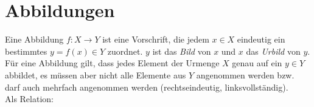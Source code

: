 \section{Abbildungen}
Eine Abbildung $f:X\to Y$ ist eine Vorschrift, die jedem $x\in X$ eindeutig ein bestimmtes
$y=f(x)\in Y$ zuordnet. $y$ ist das \emph{Bild} von $x$ und $x$ das \emph{Urbild} von $y$.
Für eine Abbildung gilt, dass jedes Element der Urmenge $X$ genau auf ein $y\in Y$ abbildet, es müssen aber nicht alle Elemente aus $Y$ angenommen werden bzw. darf auch mehrfach angenommen werden (rechtseindeutig, linksvollständig).\\
Als Relation:\\
